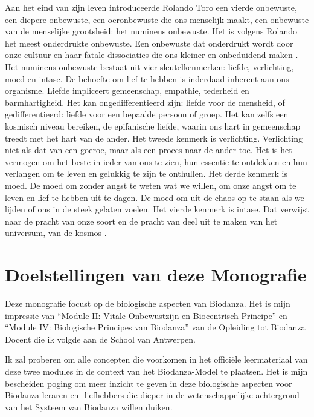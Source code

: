 \documentclass[
  11pt,
]{book}
\begin{document}
Aan het eind van zijn leven introduceerde Rolando Toro een vierde onbewuste, een diepere onbewuste, een oeronbewuste die ons menselijk maakt, een onbewuste van de menselijke grootsheid: het numineus onbewuste. Het is volgens Rolando het meest onderdrukte onbewuste. Een onbewuste dat onderdrukt wordt door onze cultuur en haar fatale dissociaties die ons kleiner en onbeduidend maken \citep{toro2009}.
Het numineus onbewuste bestaat uit vier sleutelkenmerken: liefde, verlichting, moed en intase. De behoefte om lief te hebben is inderdaad inherent aan ons organisme. Liefde impliceert gemeenschap, empathie, tederheid en barmhartigheid. Het kan ongedifferentieerd zijn: liefde voor de mensheid, of gedifferentieerd: liefde voor een bepaalde persoon of groep. Het kan zelfs een kosmisch niveau bereiken, de epifanische liefde, waarin ons hart in gemeenschap treedt met het hart van de ander. Het tweede kenmerk is verlichting. Verlichting niet als dat van een goeroe, maar als een proces naar de ander toe. Het is het vermogen om het beste in ieder van ons te zien, hun essentie te ontdekken en hun verlangen om te leven en gelukkig te zijn te onthullen. Het derde kenmerk is moed. De moed om zonder angst te weten wat we willen, om onze angst om te leven en lief te hebben uit te dagen. De moed om uit de chaos op te staan als we lijden of ons in de steek gelaten voelen. Het vierde kenmerk is intase. Dat verwijst naar de pracht van onze soort en de pracht van deel uit te maken van het universum, van de kosmos \citep{toro2009}.
\newpage 

\hypertarget{doelstellingen-van-deze-monografie}{%
\section{Doelstellingen van deze Monografie}\label{doelstellingen-van-deze-monografie}}

Deze monografie focust op de biologische aspecten van Biodanza. Het is mijn impressie van ``Module II: Vitale Onbewustzijn en Biocentrisch Principe'' en ``Module IV: Biologische Principes van Biodanza'' van de Opleiding tot Biodanza Docent die ik volgde aan de School van Antwerpen.

Ik zal proberen om alle concepten die voorkomen in het officiële leermateriaal van deze twee modules in de context van het Biodanza-Model te plaatsen. Het is mijn bescheiden poging om meer inzicht te geven in deze biologische aspecten voor Biodanza-leraren en -liefhebbers die dieper in de wetenschappelijke achtergrond van het Systeem van Biodanza willen duiken.
\end{document}
